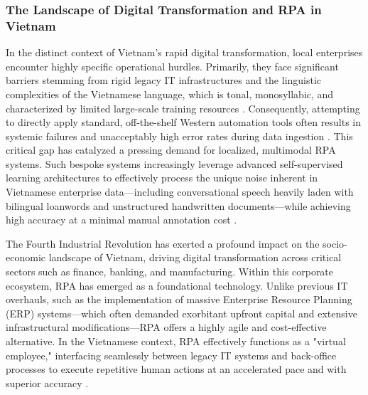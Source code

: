 \subsubsection{The Landscape of Digital Transformation and RPA in Vietnam}
In the distinct context of Vietnam's rapid digital transformation, local enterprises encounter highly specific operational hurdles. Primarily, they face significant barriers stemming from rigid legacy IT infrastructures and the linguistic complexities of the Vietnamese language, which is tonal, monosyllabic, and characterized by limited large-scale training resources \parencite{le2024phowhisper}. Consequently, attempting to directly apply standard, off-the-shelf Western automation tools often results in systemic failures and unacceptably high error rates during data ingestion \parencite{khan2025adaptive}. This critical gap has catalyzed a pressing demand for localized, multimodal RPA systems. Such bespoke systems increasingly leverage advanced self-supervised learning architectures to effectively process the unique noise inherent in Vietnamese enterprise data—including conversational speech heavily laden with bilingual loanwords and unstructured handwritten documents—while achieving high accuracy at a minimal manual annotation cost \parencite{gumber2025multimodal, zhuo2025vietasr}.

The Fourth Industrial Revolution has exerted a profound impact on the socio-economic landscape of Vietnam, driving digital transformation across critical sectors such as finance, banking, and manufacturing. Within this corporate ecosystem, RPA has emerged as a foundational technology. Unlike previous IT overhauls, such as the implementation of massive Enterprise Resource Planning (ERP) systems—which often demanded exorbitant upfront capital and extensive infrastructural modifications—RPA offers a highly agile and cost-effective alternative. In the Vietnamese context, RPA effectively functions as a "virtual employee," interfacing seamlessly between legacy IT systems and back-office processes to execute repetitive human actions at an accelerated pace and with superior accuracy \parencite{chuong2019rpa}.

